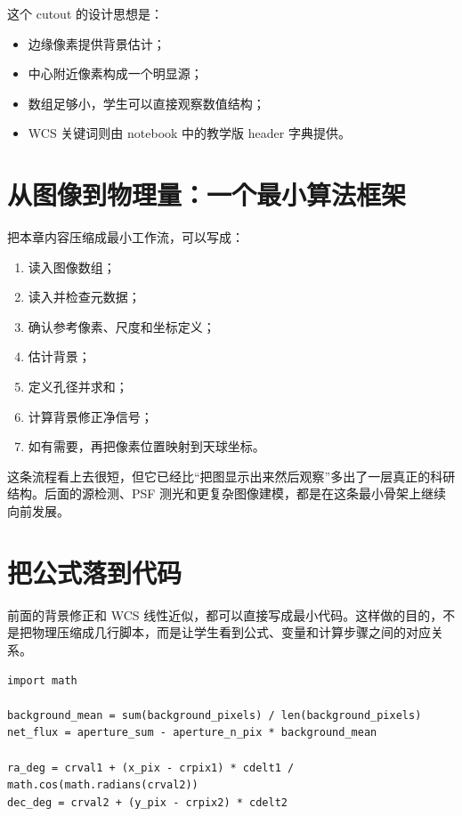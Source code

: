这个 cutout 的设计思想是：

\begin{itemize}
    \item 边缘像素提供背景估计；
    \item 中心附近像素构成一个明显源；
    \item 数组足够小，学生可以直接观察数值结构；
    \item WCS 关键词则由 notebook 中的教学版 header 字典提供。
\end{itemize}

\section{从图像到物理量：一个最小算法框架}

把本章内容压缩成最小工作流，可以写成：

\begin{enumerate}
    \item 读入图像数组；
    \item 读入并检查元数据；
    \item 确认参考像素、尺度和坐标定义；
    \item 估计背景；
    \item 定义孔径并求和；
    \item 计算背景修正净信号；
    \item 如有需要，再把像素位置映射到天球坐标。
\end{enumerate}

这条流程看上去很短，但它已经比“把图显示出来然后观察”多出了一层真正的科研结构。后面的源检测、PSF 测光和更复杂图像建模，都是在这条最小骨架上继续向前发展。

\section{把公式落到代码}

前面的背景修正和 WCS 线性近似，都可以直接写成最小代码。这样做的目的，不是把物理压缩成几行脚本，而是让学生看到公式、变量和计算步骤之间的对应关系。

\begin{examplebox}[背景修正与坐标映射的最小代码]
\begin{lstlisting}[style=pythonstyle]
import math

background_mean = sum(background_pixels) / len(background_pixels)
net_flux = aperture_sum - aperture_n_pix * background_mean

ra_deg = crval1 + (x_pix - crpix1) * cdelt1 / math.cos(math.radians(crval2))
dec_deg = crval2 + (y_pix - crpix2) * cdelt2
\end{lstlisting}
\end{examplebox}

